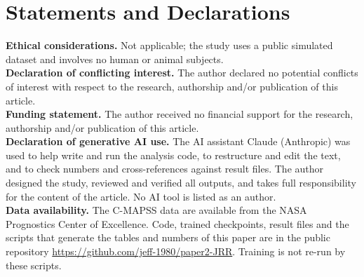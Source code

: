 \documentclass[11pt,a4paper]{article}
\newif\ifanon
\begin{document}
\section*{Statements and Declarations}
\noindent\textbf{Ethical considerations.} Not applicable; the study uses a public simulated dataset and involves no human or animal subjects.\\[2pt]
\noindent\textbf{Declaration of conflicting interest.} The author declared no potential conflicts of interest with respect to the research, authorship and/or publication of this article.\\[2pt]
\noindent\textbf{Funding statement.} The author received no financial support for the research, authorship and/or publication of this article.\\[2pt]
\noindent\textbf{Declaration of generative AI use.} The AI assistant Claude (Anthropic) was used to help write and run the analysis code, to restructure and edit the text, and to check numbers and cross-references against result files. The author designed the study, reviewed and verified all outputs, and takes full responsibility for the content of the article. No AI tool is listed as an author.\\[2pt]
\noindent\textbf{Data availability.} The C-MAPSS data are available from the NASA Prognostics Center of Excellence. Code, trained checkpoints, result files and the scripts that generate the tables and numbers of this paper are in the public repository \ifanon given to the editor\else\url{https://github.com/jeff-1980/paper2-JRR}\fi. Training is not re-run by these scripts.
\end{document}
